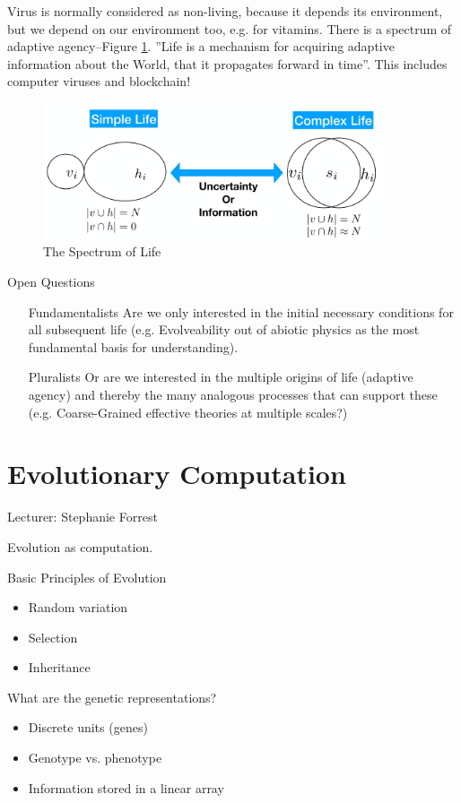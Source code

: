 \documentclass[]{article}
\begin{document}
 Virus is normally considered as non-living, because it depends its environment, but we depend on our environment too, e.g. for vitamins. There is a spectrum of adaptive agency--Figure \ref{fig:SpectrumOfLife}.  ''Life is a mechanism for acquiring adaptive information about the World, that it propagates forward in time''. This includes computer viruses and blockchain!
 
\begin{figure}[H]
	\caption{The Spectrum of Life}\label{fig:SpectrumOfLife}
	\includegraphics[width=0.9\textwidth]{SpectrumOfLife}
\end{figure}
Open Questions

\begin{itemize}
	\item[Fundamentalists] Are we only interested in the initial necessary conditions for all subsequent life (e.g. Evolveability out of abiotic physics as the most fundamental basis for understanding).
	\item[Pluralists] Or are we interested in the multiple origins of life (adaptive agency) and thereby the many analogous processes that can support these (e.g. 	Coarse-Grained effective theories at multiple scales?)
\end{itemize}


\section{Evolutionary Computation}

Lecturer: Stephanie Forrest

Evolution as computation.

Basic Principles of Evolution
\begin{itemize}
	\item Random variation
	\item Selection
	\item Inheritance
\end{itemize}

What are the genetic representations?
\begin{itemize}
	\item  Discrete units (genes)
	\item Genotype vs. phenotype
	\item Information stored in a linear array
\end{itemize}
\end{document}
